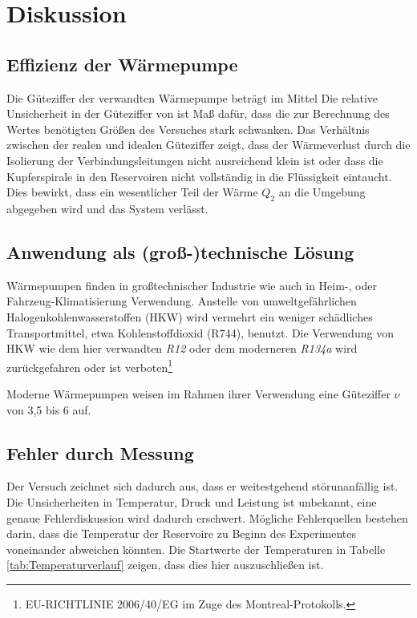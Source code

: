 \section{Diskussion}
\label{sec:Diskussion}
\subsection{Effizienz der Wärmepumpe}
Die Güteziffer der verwandten Wärmepumpe beträgt im Mittel %
Die relative Unsicherheit in der Güteziffer von  %
ist Maß dafür, dass die zur Berechnung des Wertes benötigten Größen des Versuches stark schwanken.
Das Verhältnis zwischen der realen und idealen Güteziffer zeigt, dass 
der Wärmeverlust durch die Isolierung der Verbindungsleitungen nicht ausreichend klein ist oder dass die Kupferspirale in den Reservoiren nicht vollständig in die Flüssigkeit eintaucht.
Dies bewirkt, dass ein wesentlicher Teil der Wärme $Q_2$ an die Umgebung abgegeben wird und das System verlässt.

\subsection{Anwendung als (groß-)technische Lösung}
Wärmepumpen finden in großtechnischer Industrie wie auch in Heim-, oder Fahrzeug-Klimatisierung Verwendung. 
Anstelle von umweltgefährlichen Halogenkohlenwasserstoffen (HKW) wird vermehrt ein weniger schädliches Transportmittel, etwa Kohlenstoffdioxid (R744), benutzt. 
Die Verwendung von HKW\cite{kaeltemittel} wie dem hier verwandten \textit{R12} oder dem moderneren \textit{R134a}\cite{viessmann_VITOCAL161A} wird zurückgefahren oder ist verboten\footnote{EU-RICHTLINIE 2006/40/EG im Zuge des Montreal-Protokolls.}

\noindent Moderne Wärmepumpen weisen im Rahmen ihrer Verwendung eine Güteziffer $\nu$ von 3,5 bis 6 auf\cite{viessmann_VITOCAL300G}.

\subsection{Fehler durch Messung}
Der Versuch zeichnet sich dadurch aus, dass er weitestgehend störunanfällig ist.
Die Unsicherheiten in Temperatur, Druck und Leistung ist unbekannt, eine genaue Fehlerdiskussion wird dadurch erschwert.
Mögliche Fehlerquellen bestehen darin, dass die Temperatur der Reservoire zu Beginn des Experimentes voneinander abweichen könnten.
Die Startwerte der Temperaturen in Tabelle \ref{tab:Temperaturverlauf} zeigen, dass dies hier auszuschließen ist.

